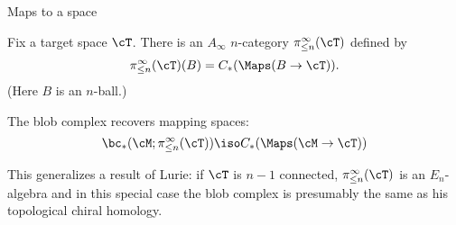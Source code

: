 \documentclass[beamer, compress]{beamer}
\begin{document}
\begin{frame}{Maps to a space}
\begin{block}{}
Fix a target space $\cT$. There is an $A_\infty$ $n$-category $\pi_{\leq n}^\infty(\cT)$ defined by
$$\pi_{\leq n}^\infty(\cT)(B) = C_*(\Maps(B\to \cT)).$$
(Here $B$ is an $n$-ball.)
\end{block}
\begin{thm}
The blob complex recovers mapping spaces:
$$\bc_*(\cM; \pi_{\leq n}^\infty(\cT)) \iso C_*(\Maps(\cM \to \cT))$$
\end{thm}
This generalizes  a result of Lurie: if $\cT$ is $n-1$ connected, $\pi_{\leq n}^\infty(\cT)$ is an $E_n$-algebra and in this special case the blob complex is presumably the same as his topological chiral homology.
\end{frame}
\end{document}
